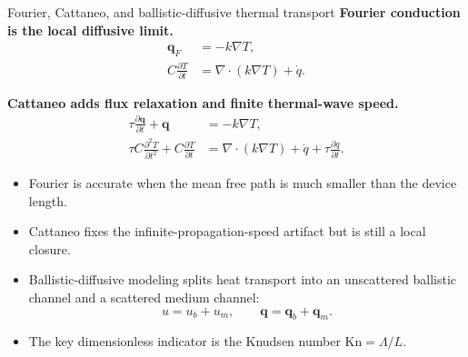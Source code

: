 \documentclass[aspectratio=169,10pt]{beamer}
\begin{document}
\begin{frame}{Fourier, Cattaneo, and ballistic-diffusive thermal transport}
\small
\textbf{Fourier conduction is the local diffusive limit.}
\vspace{-0.25em}
\begin{align*}
\mathbf q_F&=-k\nabla T,\\[-0.15em]
C\frac{\partial T}{\partial t}&=\nabla\cdot(k\nabla T)+\dot q.
\end{align*}

\vspace{-0.15em}
\textbf{Cattaneo adds flux relaxation and finite thermal-wave speed.}
\vspace{-0.25em}
\begin{align*}
\tau\frac{\partial \mathbf q}{\partial t}+\mathbf q&=-k\nabla T,\\[-0.15em]
\tau C\frac{\partial^2 T}{\partial t^2}+C\frac{\partial T}{\partial t}
&=\nabla\cdot(k\nabla T)+\dot q+\tau\frac{\partial \dot q}{\partial t}.
\end{align*}

\vspace{-0.15em}
\begin{itemize}
    \item Fourier is accurate when the mean free path is much smaller than the device length.
    \item Cattaneo fixes the infinite-propagation-speed artifact but is still a local closure.
    \item Ballistic-diffusive modeling splits heat transport into an unscattered ballistic channel and a scattered medium channel:
    \[
        u=u_b+u_m,
        \qquad
        \mathbf q=\mathbf q_b+\mathbf q_m.
    \]
    \item The key dimensionless indicator is the Knudsen number $\mathrm{Kn}=\Lambda/L$.
\end{itemize}
\end{frame}
\end{document}
